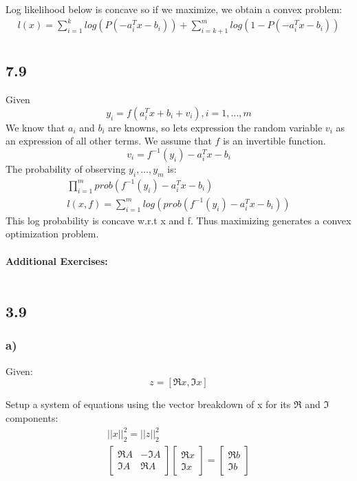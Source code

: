 \documentclass[12pt]{article}
\begin{document}
Log likelihood below is concave so if we maximize, we obtain a convex problem:
\begin{equation*}
\begin{aligned}
l(x) = \sum_{i=1}^{k}log(P(-a_i^Tx-b_i))+\sum_{i=k+1}^{m}log(1-P(-a_i^Tx-b_i))\\ 
\end{aligned}
\end{equation*}

\subsection*{7.9}
Given $$y_i = f(a_i^Tx +b_i +v_i), i=1,\dots,m$$
We know that $a_i$ and $b_i$ are knowns, so lets expression the random variable $v_i$ as an expression of all other terms. We assume that $f$ is an invertible function.
$$v_i = f^{-1}(y_i)-a_i^Tx-b_i$$
The probability of observing $y_i,\dots,y_m$ is:
\begin{equation*}
\begin{aligned}
\prod_{i=1}^{m}prob(f^{-1}(y_i)-a_i^Tx-b_i)\\
l(x, f) = \sum_{i=1}^{m}log(prob(f^{-1}(y_i)-a_i^Tx-b_i))
\end{aligned}
\end{equation*}
This log probability is concave w.r.t x and f. Thus maximizing generates a convex optimization problem.\\\\

\textbf{Additional Exercises:}\\\\
\subsection*{3.9}
\subsubsection*{a)}
Given: $$z = [\Re x, \Im x]$$

Setup a system of equations using the vector breakdown of x for its $\Re$ and $\Im$ components:
\begin{equation*}
\begin{aligned}
||x||_2^2 = ||z||_2^2\\
\begin{bmatrix}
\Re A & -\Im A\\
\Im A & \Re A
\end{bmatrix}
\begin{bmatrix}
\Re x \\
\Im x
\end{bmatrix}=
\begin{bmatrix}
\Re b\\
\Im b
\end{bmatrix}
\end{aligned}
\end{equation*}
\end{document}
